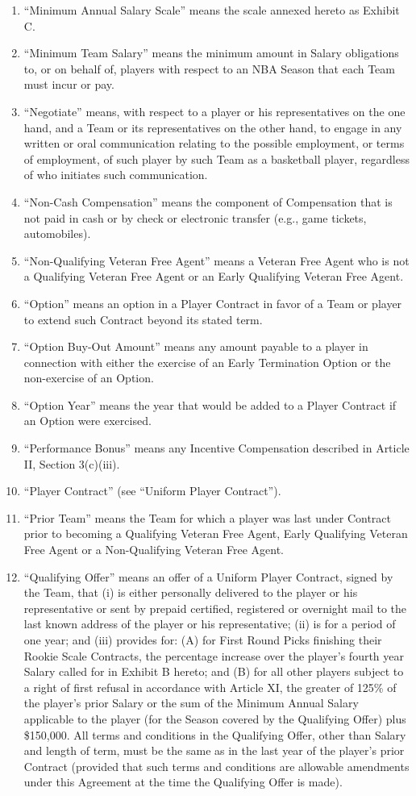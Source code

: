 \documentclass[
]{book}
\begin{document}
\begin{enumerate}
\item
  ``Minimum Annual Salary Scale'' means the scale annexed hereto as Exhibit C.
\item
  ``Minimum Team Salary'' means the minimum amount in Salary obligations to, or on behalf of, players with respect to an NBA Season that each Team must incur or pay.
\item
  ``Negotiate'' means, with respect to a player or his representatives on the one hand, and a Team or its representatives on the other hand, to engage in any written or oral communication relating to the possible employment, or terms of employment, of such player by such Team as a basketball player, regardless of who initiates such communication.
\item
  ``Non-Cash Compensation'' means the component of Compensation that is not paid in cash or by check or electronic transfer (e.g., game tickets, automobiles).
\item
  ``Non-Qualifying Veteran Free Agent'' means a Veteran Free Agent who is not a Qualifying Veteran Free Agent or an Early Qualifying Veteran Free Agent.
\item
  ``Option'' means an option in a Player Contract in favor of a Team or player to extend such Contract beyond its stated term.
\item
  ``Option Buy-Out Amount'' means any amount payable to a player in connection with either the exercise of an Early Termination Option or the non-exercise of an Option.
\item
  ``Option Year'' means the year that would be added to a Player Contract if an Option were exercised.
\item
  ``Performance Bonus'' means any Incentive Compensation described in Article II, Section 3(c)(iii).
\item
  ``Player Contract'' (see ``Uniform Player Contract'').
\item
  ``Prior Team'' means the Team for which a player was last under Contract prior to becoming a Qualifying Veteran Free Agent, Early Qualifying Veteran Free Agent or a Non-Qualifying Veteran Free Agent.
\item
  ``Qualifying Offer'' means an offer of a Uniform Player Contract, signed by the Team, that (i) is either personally delivered to the player or his representative or sent by prepaid certified, registered or overnight mail to the last known address of the player or his representative; (ii) is for a period of one year; and (iii) provides for: (A) for First Round Picks finishing their Rookie Scale Contracts, the percentage increase over the player's fourth year Salary called for in Exhibit B hereto; and (B) for all other players subject to a right of first refusal in accordance with Article XI, the greater of 125\% of the player's prior Salary or the sum of the Minimum Annual Salary applicable to the player (for the Season covered by the Qualifying Offer) plus \$150,000. All terms and conditions in the Qualifying Offer, other than Salary and length of term, must be the same as in the last year of the player's prior Contract (provided that such terms and conditions are allowable amendments under this Agreement at the time the Qualifying Offer is made).

\end{enumerate}
\end{document}
